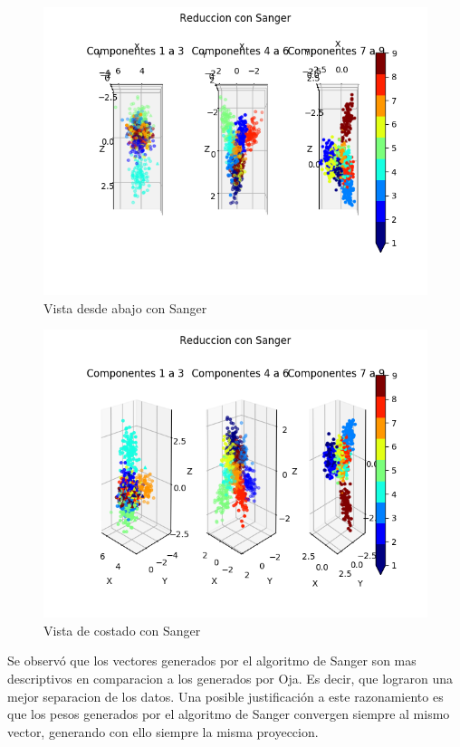 \begin{figure}[H]
  \includegraphics[width=160mm]{imagenes/componentes_sanger_2.png}
  \caption{Vista desde abajo con Sanger}
\end{figure}

\begin{figure}[H]
  \includegraphics[width=160mm]{imagenes/componentes_sanger_3.png}
  \caption{Vista de costado con Sanger}
\end{figure}

Se observó que los vectores generados por el algoritmo de Sanger son mas descriptivos en comparacion a los generados por Oja.
 Es decir, que lograron una mejor separacion de los datos. Una posible justificación a este razonamiento es que los pesos generados
  por el algoritmo de Sanger convergen siempre al mismo vector, generando con ello siempre la misma proyeccion.

